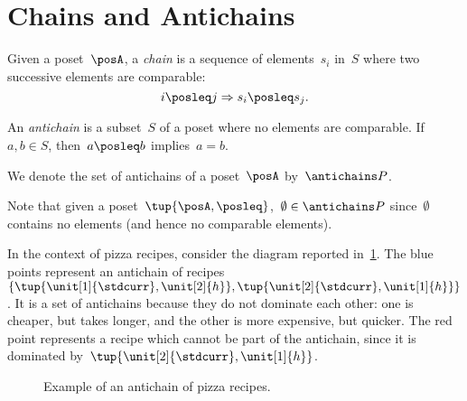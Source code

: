 

\section{Chains and Antichains}
\label{sec:chains-antichains}

\begin{definition}
  \label{def:chain}
  Given a poset~$\posA$, a \emph{chain} is a sequence of elements~${s_i}$ in~$S$ where two successive elements are comparable:
  \begin{equation}
    i \posleq j \Rightarrow s_i \posleq s_j.
  \end{equation}
\end{definition}


\begin{definition}
  \label{def:antichain}
  An \emph{antichain} is a subset~$S$ of a poset where no elements are comparable. If~$a,b \in S$, then~$a \posleq b$ implies~$a=b$.
\end{definition}
\begin{remark}
  We denote the set of antichains of a poset~$\posA$ by~$\antichains P$.
\end{remark}
\begin{remark}
  Note that given a poset~$\tup{\posA,\posleq}$,~$\emptyset \in \antichains P$ since~$\emptyset$ contains no elements (and hence no comparable elements).
\end{remark}

In the context of pizza recipes, consider the diagram reported in~\cref{fig:antichain}. The blue points represent an antichain of recipes~$\{\tup{\unit[1]{\stdcurr},\unit[2]{h}},\tup{\unit[2]{\stdcurr},\unit[1]{h}}\}$.
It is a set of antichains because they do not dominate each other: one is cheaper, but takes longer, and the other is more expensive, but quicker.
The red point represents a recipe which cannot be part of the antichain, since it is dominated by~$\tup{\unit[2]{\stdcurr},\unit[1]{h}}$.

\begin{figure}[h!]
  \begin{center}
  \end{center}
  \caption{Example of an antichain of pizza recipes. \label{fig:antichain}}
\end{figure}


